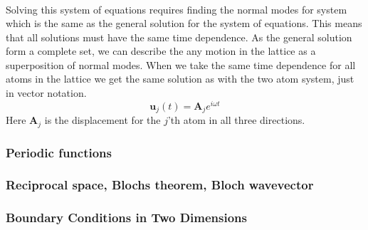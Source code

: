 \begin{align}
\end{align}Solving this system of equations requires finding the normal modes for system which is the same as the general solution for the system of equations. This means that all solutions must have the same time dependence. As the general solution form a complete set, we can describe the any motion in the lattice as a superposition of normal modes. When we take the same time dependence for all atoms in the lattice we get the same solution as with the two atom system, just in vector notation.\begin{equation}
    \mathbf{u}_{j}(t)=\mathbf{A}_{j}e^{i\omega t}
\end{equation}Here $\mathbf{A}_{j}$ is the displacement for the $j$'th atom in all three directions. 


\subsubsection{Periodic functions}
\subsubsection{Reciprocal space, Blochs theorem, Bloch wavevector}

\subsubsection{Boundary Conditions in Two Dimensions}

